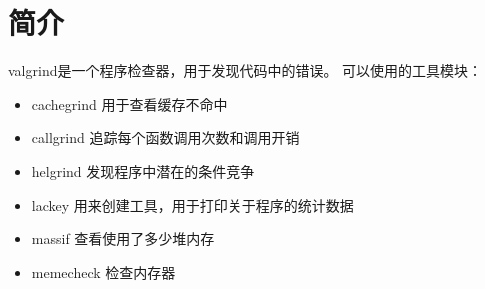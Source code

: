 \documentclass{ctexart}
\begin{document}
	
\section{简介}
valgrind是一个程序检查器，用于发现代码中的错误。
可以使用的工具模块：
\begin{itemize}
  \item cachegrind 用于查看缓存不命中
  \item callgrind 追踪每个函数调用次数和调用开销
  \item helgrind 发现程序中潜在的条件竞争
  \item lackey 用来创建工具，用于打印关于程序的统计数据
  \item massif 查看使用了多少堆内存
  \item memecheck 检查内存器
\end{itemize}

	
	
\end{document}
